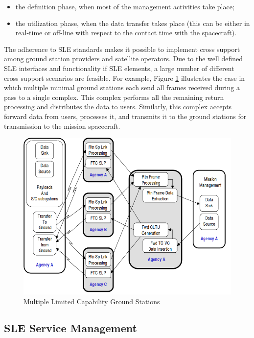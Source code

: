 \begin{itemize}
\item the definition phase, when most of the management activities take place;
\item the utilization phase, when the data transfer takes place (this can be either in real-time or off-line with respect to the contact time with the spacecraft).
\end{itemize}

The adherence to SLE standards makes it possible to implement cross support among ground station providers and satellite operators. Due to the well defined SLE interfaces and functionality if SLE elements, a large number of different cross support scenarios are feasible. For example, Figure \ref{fig:Multiple Limited Capability Ground Stations} illustrates the case in which multiple minimal ground stations each send all frames received during a pass to a single complex. This complex performs all the remaining return processing and distributes the data to users. Similarly, this complex accepts forward data from users, processes it, and transmits it to the ground stations for transmission to the mission spacecraft.

\begin{figure}[h]
\centering\includegraphics[scale=0.5]{fig/multiple_limited_capability_ground_stations}
\caption{Multiple Limited Capability Ground Stations}
\label{fig:Multiple Limited Capability Ground Stations}
\end{figure}

\subsection{SLE Service Management}

